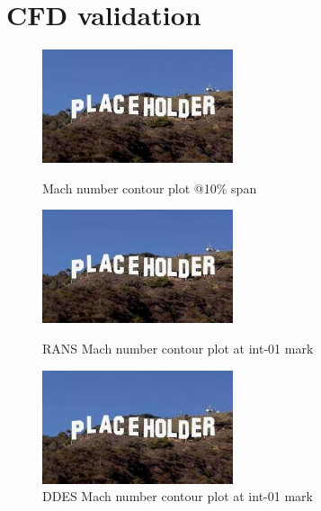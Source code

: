 
\chapter{CFD validation} %

\label{cfd_results} %

\begin{figure}[ht]
  \centering
  \includegraphics[width=0.5\textwidth]{Pictures/placeholder.jpg}
  \caption{Mach number contour plot @10\% span \citep{r67laser}} \label{10-mach-exp}
  
  \vspace*{\floatsep}%

  \includegraphics[width=0.5\textwidth]{Pictures/placeholder.jpg}
  \caption{RANS Mach number contour plot at int-01 mark} \label{int-01-rans-mach}
  
   \vspace*{\floatsep}%
   
  \includegraphics[width=0.5\textwidth]{Pictures/placeholder.jpg}
  \caption{DDES Mach number contour plot at int-01 mark} \label{int-01-ddes-mach}
\end{figure}

